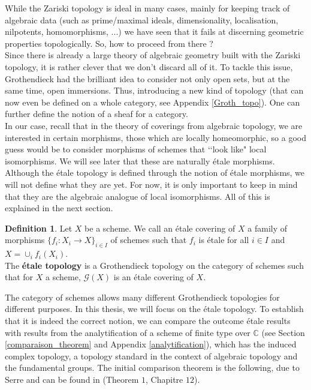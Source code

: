 \documentclass{article}
\theoremstyle{plain}
\theoremstyle{definition}
\newtheorem{definition}[theorem]{Definition}
\begin{document}
\noindent While the Zariski topology is ideal in many cases, mainly for keeping track of algebraic data (such as prime/maximal ideals, dimensionality, localisation, nilpotents, homomorphisms, ...) 
we have seen that it fails at discerning geometric properties topologically. 
So, how to proceed from there ?\\
Since there is already a large theory of algebraic geometry built with the Zariski topology, it is rather clever that we don't discard all of it.
To tackle this issue, Grothendieck had the brilliant idea to consider not only open sets, but at the same time, open immersions. 
Thus, introducing a new kind of topology (that can now even be defined on a whole category, see Appendix \ref{Groth_topo}).
One can further define the notion of a sheaf for a category. \\

\noindent In our case, recall that in the theory of coverings from algebraic topology, we are interested in certain morphisms, those which are locally homeomorphic, so a good guess would be to consider morphisms of schemes that ‘‘look like" local isomorphisms.
We will see later that these are naturally \'etale morphisms.
Although the \'etale topology is defined through the notion of \'etale morphisms, we will not define what they are yet. 
For now, it is only important to keep in mind that they are the algebraic analogue of local isomorphisms. All of this is explained in the next section.

\begin{definition}
\label{def_etale_covering}
    Let $X$ be a scheme. We call an \'etale covering of $X$ a family of morphisms  $\{f_i:X_i\rightarrow X\}_{i\in I}$ of schemes such that $f_i$ is \'etale for all $i\in I$ and $X = \cup_i f_i(X_i)$. \\
    The \textbf{\'etale topology} is a Grothendieck topology on the category of schemes such that for $X$ a scheme, $\mathcal{G}(X)$ is an \'etale covering of $X$.
\end{definition}

\noindent The category of schemes allows many different Grothendieck topologies for different purposes. 
In this thesis, we will focus on the \'etale topology.
To establish that it is indeed the correct notion, we can compare the outcome \'etale results with 
results from the analytification of a scheme of finite type over $\mathbb{C}$ (see Section \ref{comparaison_theorem} and Appendix \ref{analytification}), which has the induced complex topology, 
a topology standard in the context of algebraic topology and the fundamental groups.
The initial comparison theorem is the following, due to Serre and can be found in \cite{Serre} (Theorem $1$, Chapitre $12$).
\end{document}
